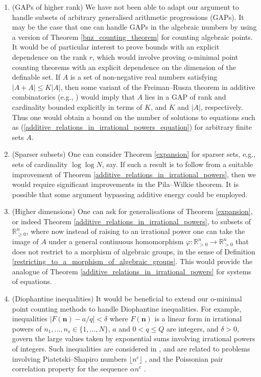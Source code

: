 \documentclass[9pt]{amsart}
\theoremstyle{my_theorem_style}
\numberwithin{definition}{section}
\renewcommand{\phi}{\varphi}
\newcommand{\R}{\mathbb{R}}
\renewcommand{\vec}[1]{\bm{#1}}
\begin{document}
\begin{enumerate}[(1)]
    \item (GAPs of higher rank) 
    We have not been able to adapt our argument to handle subsets of arbitrary generalised arithmetic progressions (GAPs). It may be the case that one can handle GAPs in the algebraic numbers by using a version of Theorem \ref{bnz_counting_theorem} for counting algebraic points. It would be of particular interest to prove bounds with an explicit dependence on the rank $r$, which would involve proving o-minimal point counting theorems with an explicit dependence on the dimension of the definable set. If $A$ is a set of non-negative real numbers satisfying $|A + A| \leq K |A|$, then some variant of the Freiman--Rusza theorem in additive combinatorics (e.g., \cite{Green--Rusza_Freimans_theorem_in_an_arbitrary_abelian_group}) would imply that $A$ lies in a GAP of rank and cardinality bounded explicitly in terms of $K$, and $K$ and $|A|$, respectively. Thus one would obtain a bound on the number of solutions to equations such as (\ref{additive_relations_in_irrational_powers_equation}) for arbitrary finite sets $A$.
    \item (Sparser subsets) One can consider Theorem \ref{expansion} for sparser sets, e.g., sets of cardinality $\log\log N$, say. If such a result is to follow from a suitable improvement of Theorem \ref{additive_relations_in_irrational_powers}, then we would require significant improvements in the Pila--Wilkie theorem. It is possible that some argument bypassing additive energy could be employed.
    \item (Higher dimensions)
    One can ask for generalisations of Theorem \ref{expansion}, or indeed Theorem \ref{additive_relations_in_irrational_powers}, to subsets of $\R_{\geq 0}^n$, where now instead of raising to an irrational power one can take the image of $A$ under a general continuous homomorphism $\phi : \R_{>0}^n \to \R_{>0}^n$ that does not restrict to a morphism of algebraic groups, in the sense of Definition \ref{restricting_to_a_morphism_of_algebraic_groups}. This would provide the analogue of Theorem \ref{additive_relations_in_irrational_powers} for systems of equations.
    \item (Diophantine inequalities)
    It would be beneficial to extend our o-minimal point counting methods to handle Diophantine inequalities. For example, inequalities $|F(\vec{n}) - a/q| < \delta$ where $F(\vec{n})$ is a linear form in irrational powers of $n_1, \dots, n_s \in \{1, \dots, N\}$, $a$ and $0 < q \leq Q$ are integers, and $\delta > 0$, govern the large values taken by exponential sums involving irrational powers of integers. Such inequalities are considered in \cite{Robert--Sargos_three-dimensional_exponential_sums_with_monomials}, and are related to problems involving Piatetski--Shapiro numbers $\lfloor n^c \rfloor$ \cite{Chapman--Chow--Holdridge_additive_Ramsey_theory_over_Piatetski-Shapiro_numbers}, and the Poissonian pair correlation property for the sequence $\alpha n^c$ \cite{Radziwill--Shubin}.
\end{enumerate}
\end{document}
